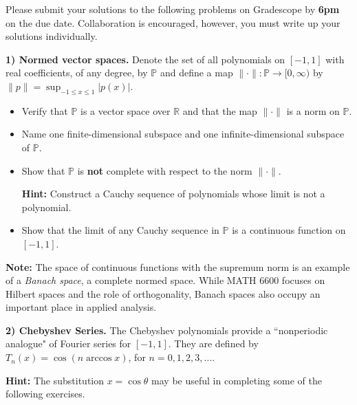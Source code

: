\documentclass[12pt]{article}
\begin{document}
\noindent
Please submit your solutions to the following problems on Gradescope by \textbf{6pm} on the due date. Collaboration is encouraged, however, you must write up your solutions individually.

\bigskip

\noindent
\textbf{1) Normed vector spaces.} Denote the set of all polynomials on $[-1,1]$ with real coefficients, of any degree, by $\mathbb{P}$ and define a map $\|\cdot\|:\mathbb{P}\rightarrow[0,\infty)$ by $\|p\|=\sup_{-1\leq x\leq 1}|p(x)|$.

\begin{itemize}

	\item[\textbf{(a)}] Verify that $\mathbb{P}$ is a vector space over $\mathbb{R}$ and that the map $\|\cdot\|$ is a norm on $\mathbb{P}$.

	\item[\textbf{(b)}] Name one finite-dimensional subspace and one infinite-dimensional subspace of $\mathbb{P}$.

	\item[\textbf{(c)}] Show that $\mathbb{P}$ is \textbf{not} complete with respect to the norm $\|\cdot\|$. 

	\noindent
	\textbf{Hint:} Construct a Cauchy sequence of polynomials whose limit is not a polynomial.

	\item[\textbf{(d)}] Show that the limit of any Cauchy sequence in $\mathbb{P}$ is a continuous function on $[-1,1]$.
     
\end{itemize}

\noindent
\textbf{Note:} The space of continuous functions with the supremum norm is an example of a \textit{Banach space}, a complete normed space. While MATH 6600 focuses on Hilbert spaces and the role of orthogonality, Banach spaces also occupy an important place in applied analysis.


\bigskip

\noindent
\textbf{2) Chebyshev Series.} The Chebyshev polynomials provide a ``nonperiodic analogue" of Fourier series for $[-1,1]$. They are defined by $T_n(x) = \cos(n\arccos x)$, for $n=0,1,2,3,\ldots$.

\medskip
\noindent
\textbf{Hint:} The substitution $x=\cos\theta$ may be useful in completing some of the following exercises.
\end{document}
